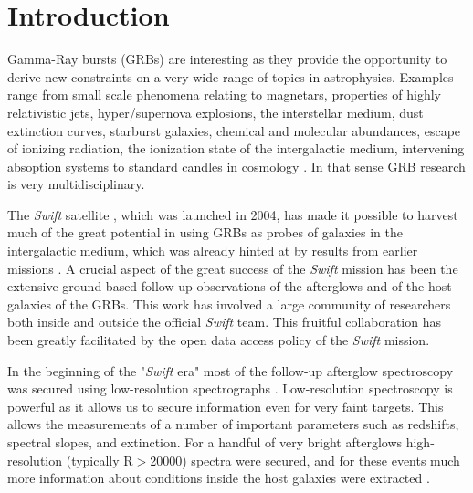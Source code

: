 \documentclass{aa}    %
\begin{document}
\section{Introduction}

Gamma-Ray bursts (GRBs) are interesting as they provide the opportunity to
derive new constraints on a very wide range of topics in astrophysics. Examples
range from small scale phenomena relating to magnetars, properties of highly
relativistic jets, hyper/supernova explosions, the interstellar medium, dust
extinction curves, starburst galaxies, chemical and molecular abundances, escape
of ionizing radiation, the ionization state of the intergalactic medium,
intervening absoption systems to standard candles in cosmology
\citep[e.g.,][]{Lyons2010, Molinari2007, HjorthBloom2012, Wijers1998,
	Prochaska2009, Savaglio2006, Ghirlanda2007}. In that sense GRB research is very
multidisciplinary.

The {\it Swift} satellite \citep{Gehrels2009}, which was launched in 2004, has
made it possible to harvest much of the great potential in using GRBs as probes
of galaxies in the intergalactic medium, which was already hinted at by results
from earlier missions \citep[e.g.,][]{Ricker2004}. A crucial aspect of the great
success of the {\it Swift} mission has been the extensive ground based
follow-up observations of the afterglows and of the host galaxies of the GRBs.
This work has involved a large community of researchers both inside and outside
the official {\it Swift} team. This fruitful collaboration has been greatly
facilitated by the open data access policy of the {\it Swift} mission.

In the beginning of the "{\it Swift} era" most of the follow-up afterglow
spectroscopy was secured using low-resolution spectrographs \citep[typically
R=$\lambda/\Delta\lambda$$<$1000, e.g.][]{Fynbo2009}. Low-resolution
spectroscopy is powerful as it allows us to secure information even for very faint
targets. This allows the measurements of a number of important parameters such
as redshifts, spectral slopes, and extinction. For a handful of very bright
afterglows high-resolution (typically R$>$20000) spectra were secured, and for
these events much more information about conditions inside the host galaxies
were extracted \citep[e.g.,][]{Fiore2005, Thone2007, Prochaska2007,
	Vreeswijk2007, Castro-Tirado2010}.
\end{document}

